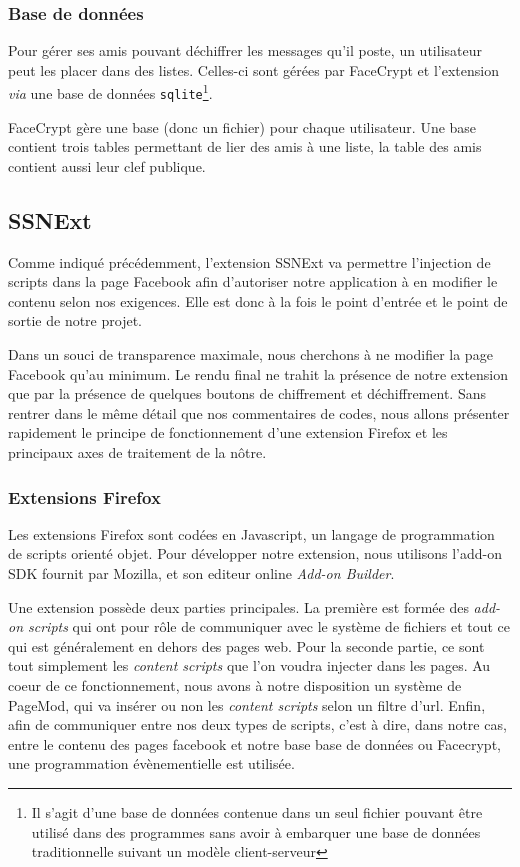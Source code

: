 \documentclass[a4paper,11pt,french]{article}
\begin{document}
\subsubsection{Base de données}
Pour gérer ses amis pouvant déchiffrer les messages qu'il poste, un utilisateur
peut les placer dans des listes. Celles-ci sont gérées par FaceCrypt et 
l'extension \emph{via} une base de données \texttt{sqlite}\footnote{Il s'agit
d'une base de données contenue dans un seul fichier pouvant être utilisé dans 
des programmes sans avoir à embarquer une base de données traditionnelle suivant
un modèle client-serveur}. 

FaceCrypt gère une base (donc un fichier) pour chaque utilisateur. Une base 
contient trois tables permettant de lier des amis à une liste, la table des 
amis contient aussi leur clef publique.

\subsection{SSNExt} %
Comme indiqué précédemment, l'extension SSNExt va permettre l'injection de 
scripts dans la page Facebook afin d'autoriser notre application à en modifier 
le contenu selon nos exigences. Elle est donc à la fois le point d'entrée et 
le point de sortie de notre projet. 

Dans un souci de transparence maximale, nous cherchons à ne modifier la page 
Facebook qu'au minimum. Le rendu final ne trahit la présence de notre extension 
que par la présence de quelques boutons de chiffrement et déchiffrement. Sans 
rentrer dans le même détail que nos commentaires de codes, nous allons présenter 
rapidement le principe de fonctionnement d'une extension Firefox et les principaux 
axes de traitement de la nôtre.

\subsubsection{Extensions Firefox}
Les extensions Firefox sont codées en Javascript, un langage de programmation de 
scripts orienté objet. Pour développer notre extension, nous utilisons l'add-on 
SDK fournit par Mozilla, et son editeur online \emph{Add-on Builder}.

Une extension possède deux parties principales. La première est formée des 
\emph{add-on scripts} qui ont pour rôle de communiquer avec le système de fichiers 
et tout ce qui est généralement en dehors des pages web. Pour la seconde partie, 
ce sont tout simplement les \emph{content scripts} que l'on voudra injecter dans
les pages. Au coeur de ce fonctionnement, nous avons à notre disposition un système 
de PageMod, qui va insérer ou non les \emph{content scripts} selon un filtre d'url. 
Enfin, afin de communiquer entre nos deux types de scripts, c'est à dire, dans notre
cas, entre le contenu des pages facebook et notre base base de données ou Facecrypt, 
une programmation évènementielle est utilisée.
\end{document}
